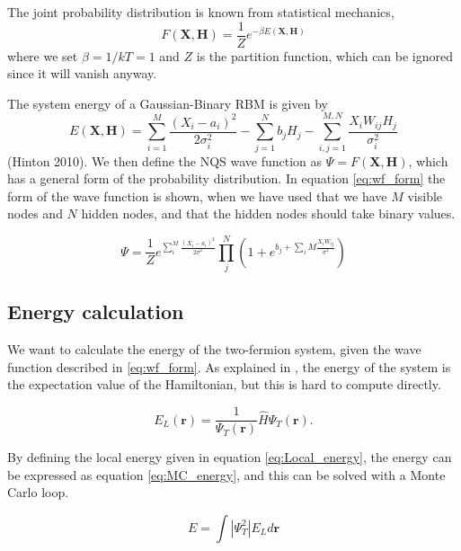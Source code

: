 \documentclass[norsk,a4paper,12pt]{article}
\begin{document}
The joint probability distribution is known from statistical mechanics,
\begin{equation}
\label{eq:F_rbm}
F(\boldsymbol{X},\boldsymbol{H})=\frac{1}{Z}e^{-\beta E(\boldsymbol{X},\boldsymbol{H})}
\end{equation}
where we set $\beta=1/kT=1$ and $Z$ is the partition function, which can be ignored since it will vanish anyway. 

The system energy of a Gaussian-Binary RBM is given by
\begin{equation}
E(\boldsymbol{X},\boldsymbol{H})=\sum_{i=1}^{M}\frac{(X_i-a_i)^2}{2\sigma_i^2}-\sum_{j=1}^Nb_jH_j-\sum_{i,j=1}^{M,N}\frac{X_iW_{ij}H_j}{\sigma_i^2}
\end{equation}
(Hinton 2010). We then define the NQS wave function as $\Psi = F(\boldsymbol{X},\boldsymbol{H})$, which has a general form of the probability distribution. In equation \ref{eq:wf_form} the form of the wave function is shown, when we have used that we have $M$ visible nodes and $N$ hidden nodes, and that the hidden nodes should take binary values. 

\begin{equation}
\label{eq:wf_form}
	\Psi = \frac{1}{Z} e^{\sum_i^M \frac{(X_i - a_i)^2}{2\sigma^2}} \prod_j^N (1+ e^{b_j + \sum_iM \frac{X_i W_{ij}}{\sigma^2}})
\end{equation}

\subsection{Energy calculation} \label{sec:RBM_energy_cal}
We want to calculate the energy of the two-fermion system, given the wave function described in \ref{eq:wf_form}. As explained in \cite{Nordhagen}, the energy of the system is the expectation value of the Hamiltonian, but this is hard to compute directly. 

\begin{equation}
E_L(\boldsymbol{r})=\frac{1}{\Psi_T(\boldsymbol{r})}\hat{H}\Psi_T(\boldsymbol{r}).
\label{eq:Local_energy}
\end{equation}

By defining the local energy given in equation \ref{eq:Local_energy}, the energy can be expressed as equation \ref{eq:MC_energy}, and this can be solved with a Monte Carlo loop.

\begin{equation}
\label{eq:MC_energy}
E = \int | \Psi_T^2| E_L d\boldsymbol{r}
\end{equation}
\end{document}
